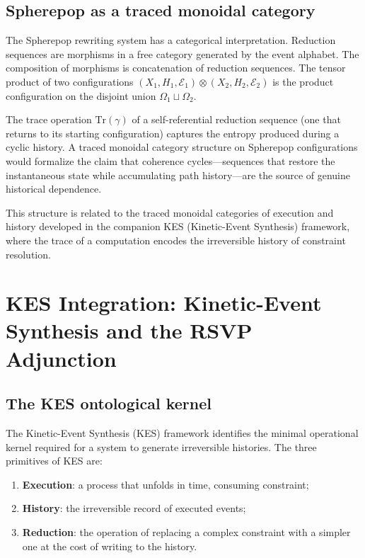 \documentclass[12pt, oneside]{memoir}
\begin{document}
\section{Spherepop as a traced monoidal category}

The Spherepop rewriting system has a categorical interpretation.  Reduction sequences
are morphisms in a free category generated by the event alphabet.  The composition of
morphisms is concatenation of reduction sequences.  The tensor product of two
configurations $(X_1, H_1, \mathcal{E}_1) \otimes (X_2, H_2, \mathcal{E}_2)$ is the
product configuration on the disjoint union $\Omega_1 \sqcup \Omega_2$.

The trace operation $\mathrm{Tr}(\gamma)$ of a self-referential reduction sequence
(one that returns to its starting configuration) captures the entropy produced during a
cyclic history.  A traced monoidal category structure on Spherepop configurations would
formalize the claim that coherence cycles---sequences that restore the instantaneous
state while accumulating path history---are the source of genuine historical dependence.

This structure is related to the traced monoidal categories of execution and history
developed in the companion KES (Kinetic-Event Synthesis) framework, where the trace of a
computation encodes the irreversible history of constraint resolution.

\chapter{KES Integration: Kinetic-Event Synthesis and the RSVP Adjunction}
\label{ch:kes}

\section{The KES ontological kernel}

The Kinetic-Event Synthesis (KES) framework identifies the minimal operational kernel
required for a system to generate irreversible histories.  The three primitives of KES
are:
\begin{enumerate}
  \item \textbf{Execution}: a process that unfolds in time, consuming constraint;
  \item \textbf{History}: the irreversible record of executed events;
  \item \textbf{Reduction}: the operation of replacing a complex constraint with a
        simpler one at the cost of writing to the history.
\end{enumerate}
\end{document}
